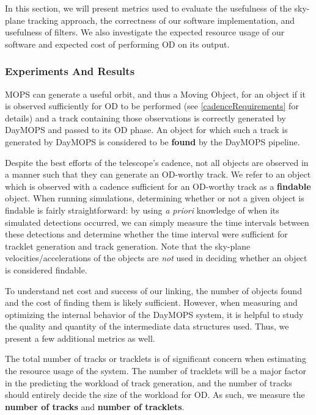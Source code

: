 \documentclass[12pt,preprint]{aastex}
\begin{document}

In this section, we will present metrics used to evaluate the
usefulness of the sky-plane tracking approach, the correctness of our
software implementation, and usefulness of filters. We also
investigate the expected resource usage of our software and expected cost
of performing OD on its output.



\subsubsection{Experiments And Results}

MOPS can generate a useful orbit, and thus a Moving Object, for an
object if it is observed sufficiently for OD to be performed (see
\ref{cadenceRequirements} for details) and a track containing those
observations is correctly generated by DayMOPS and passed to its OD
phase.  An object for which such a track is generated by DayMOPS is
considered to be \textbf{found} by the DayMOPS pipeline.  

Despite the best efforts of the telescope's cadence, not all objects
are observed in a manner such that they can generate an OD-worthy
track.  We refer to an object which is observed with a cadence
sufficient for an OD-worthy track as a \textbf{findable} object.  When
running simulations, determining whether or not a given object is
findable is fairly straightforward: by using \textit{a priori}
knowledge of when its simulated detections occurred, we can simply
measure the time intervals between these detections and determine
whether the time interval were sufficient for tracklet generation and
track generation.  Note that the sky-plane velocities/accelerations of
the objects are \textit{not} used in deciding whether an object is
considered findable.


To understand net cost and success of our linking, the number of
objects found and the cost of finding them is likely sufficient.
However, when measuring and optimizing the internal behavior of the
DayMOPS system, it is helpful to study the quality and quantity of the
intermediate data structures used. Thus, we present a few additional
metrics as well.

The total number of tracks or tracklets is of significant concern when
estimating the resource usage of the system.  The number of tracklets
will be a major factor in the predicting the workload of track
generation, and the number of tracks should entirely decide the size
of the workload for OD.  As such, we measure the \textbf{number of
  tracks} and \textbf{number of tracklets}.  
\end{document}

